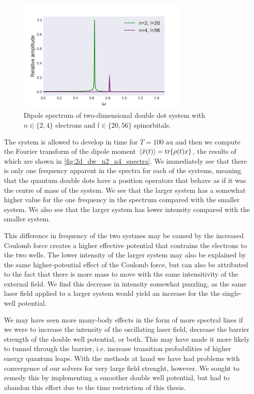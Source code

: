 \begin{figure}
    \centering
    \includegraphics[width=0.75\textwidth]{results/figures/DW/dw_n2_n4_spectrum.png} 
    \caption{Dipole spectrum of two-dimensional double dot system with $n\in\{2,4\}$
        electrons and $l\in\{20, 56\}$ spinorbitals. 
    }
    \label{fig:2d_dw_n2_n4_spectra}
\end{figure}

The system is allowed to develop in time for $T = 100 \text{ au}$ and then we compute the Fourier 
transform of the dipole moment $\ev{\hat{x}(t)} = \tr{\rho(t) x}$, the results of which are shown 
in \autoref{fig:2d_dw_n2_n4_spectra}. We immediately see that there is only one frequency 
apparent in the spectra for each of the systems, meaning that the quantum double dots
have a position operators that behave as if it was the centre of mass of the system. We 
see that the larger system has a somewhat higher value for the one frequency in the spectrum 
compared with the smaller system. We also see that the larger system has lower intensity compared
with the smaller 
system.

This difference in frequency of the two systmes may be caused by the increased Coulomb force
creates a higher effective potential that contrains the electrons to the two wells.
The lower intensity of the larger system may also be explained by the same higher-potential effect 
of the Coulomb force, but can also be attributed to the fact that there is more mass to move with 
the same intensitivity of the external field. We find this decrease in intensity somewhat puzzling,
as the same laser field applied to a larger system would yield an increase for the the single-well 
potential.

We may have seen more many-body effects in the form of more spectral lines if we were to increase 
the intensity of the oscillating laser field, decrease the barrier strength of the double well potential,
or both. This may have made it more likely to tunnel through the barrier, i.e. increase transition 
probabilities of higher energy quantum leaps. With the methods at hand we have had problems with 
convergence of our solvers for very large field strenght, however. We sought to remedy this by 
implementing a smoother double well potential, but had to abandon this effort due to the time 
restriction of this thesis.



